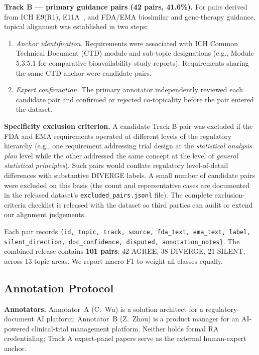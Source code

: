 \documentclass[manuscript]{acmart}
\begin{document}
\textbf{Track B --- primary guidance pairs (42 pairs, 41.6\%).}
For pairs derived from ICH E9(R1), E11A~\cite{iche11a2024}, and FDA/EMA
biosimilar and gene-therapy guidance, topical alignment was established in
two steps:

\begin{enumerate}
\item \textit{Anchor identification.} Requirements were associated with ICH
  Common Technical Document (CTD) module and sub-topic designations (e.g.,
  Module 5.3.5.1 for comparative bioavailability study reports). Requirements
  sharing the same CTD anchor were candidate pairs.
\item \textit{Expert confirmation.} The primary annotator independently
  reviewed each candidate pair and confirmed or rejected co-topicality before
  the pair entered the dataset.
\end{enumerate}

\textbf{Specificity exclusion criterion.}
A candidate Track B pair was excluded if the FDA and EMA requirements operated
at different levels of the regulatory hierarchy (e.g., one requirement
addressing trial design at the \textit{statistical analysis plan} level while
the other addressed the same concept at the level of \textit{general
statistical principles}). Such pairs would conflate regulatory
level-of-detail differences with substantive DIVERGE labels.
A small number of candidate pairs were excluded on this basis (the count and
representative cases are documented in the released dataset's
\texttt{excluded\_pairs.jsonl} file). The complete exclusion-criteria checklist
is released with the dataset so third parties can audit or extend our alignment
judgements.

Each pair records
\texttt{\{id, topic, track, source, fda\_text, ema\_text, label,
silent\_direction, doc\_confidence, disputed, annotation\_notes\}}.
The combined release contains \textbf{101 pairs}: 42 AGREE, 38 DIVERGE, 21
SILENT, across 13 topic areas. We report macro-F1 to weight all classes equally.

\subsection{Annotation Protocol}
\label{sec:annotation}

\textbf{Annotators.} Annotator~A (C.~Wu) is a solution architect for a
regulatory-document AI platform; Annotator~B (Z.~Zhou) is a product manager for
an AI-powered clinical-trial management platform. Neither holds formal RA
credentialing; Track A expert-panel papers serve as the external human-expert
anchor.
\end{document}
